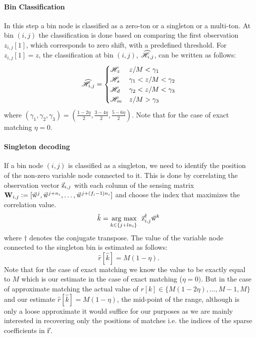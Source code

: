 \documentclass[journal,11pt,onecolumn]{IEEEtran}  %
\begin{document}
\paragraph*{Bin Classification} In this step a bin node is classified as a zero-ton or a singleton or a multi-ton. At bin $(i,j)$ the classification is done based on  comparing the first observation $z_{i,j}[1]$, which corresponds to zero shift, with a predefined threshold. For $z_{i,j}[1]=z$, the classification at bin $(i,j)$, $\widehat{\mathscr{H}}_{i,j}$, can be written as follows:
\begin{align}
\label{Eqn:BinClassifApprox}
\widehat{\mathscr{H}}_{i,j}=
\begin{cases}
\mathscr{H}_z &  	 z/M < \gamma_1\\
\mathscr{H}_s &	  \gamma_1 < z/M < \gamma_2  \\
\mathscr{H}_d  &    \gamma_2  < z/M <  \gamma_3\\ 
\mathscr{H}_m &      z/M > \gamma_3\\
\end{cases}
\end{align}
where $(\gamma_1,\gamma_2,\gamma_3)=(\frac{1-2\eta}{2},\frac{3-4\eta}{2},\frac{5-6\eta}{2})$. Note that for the case of exact matching $\eta=0$.
\paragraph*{Singleton decoding}
 If a bin node $(i,j)$ is classified as a singleton, we need to identify the position of the non-zero variable node connected to it. This is done by correlating the observation vector $\vec{\mathrm{z}}_{i,j}$ with each column of the sensing matrix  $\mathbf{W}_{i,j} \mathrel{\mathop:}= [\vec{\mathrm{w}}^{j},\vec{\mathrm{w}}^{j+n_i},\ldots,   \vec{\mathrm{w}}^{j+(f_i-1)n_i}]$ and choose the index that maximizes the correlation value.
\begin{align*}
 \hat{k} = \underset{k\in\{j+l n_i\}}{\operatorname*{\,arg\ max}}~~ \vec{\mathrm{z}}^{\dagger}_{i,j} \vec{\mathrm{w}}^{k}
\end{align*}
where $\dagger$ denotes the conjugate transpose. The value of the variable node connected to the singleton bin is estimated as follows:
 $$
 \hat{r}[\hat{k}]=M(1-\eta).
 $$
 Note that for the case of exact matching we know the value to be exactly equal to $M$ which is our estimate in the case of exact matching ($\eta=0)$. But in the case of approximate matching the actual value of $r[k]\in\{M(1-2\eta),\ldots,M-1,M\}$ and our estimate $ \hat{r}[\hat{k}]=M(1-\eta)$, the mid-point of the range, although is only a loose approximate it would suffice for our purposes as we are mainly interested in recovering only the positions of matches i.e. the indices of the sparse coefficients in $\vec{\mathrm{r}}$.			 
\end{document}

